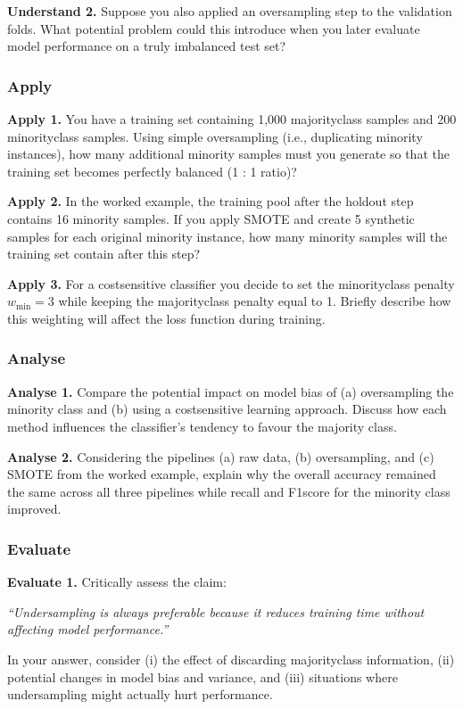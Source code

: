 \documentclass[12pt, a4paper]{article}
\begin{document}
\textbf{Understand 2.} Suppose you also applied an oversampling step to the validation folds.  What potential problem could this introduce when you later evaluate model performance on a truly imbalanced test set?  

\newpage
\subsubsection{Apply}
\textbf{Apply 1.} You have a training set containing 1,000 majorityclass samples and 200 minorityclass samples.  Using simple oversampling (i.e., duplicating minority instances), how many additional minority samples must you generate so that the training set becomes perfectly balanced (1 : 1 ratio)?  

\textbf{Apply 2.} In the worked example, the training pool after the holdout step contains 16 minority samples.  If you apply SMOTE and create 5 synthetic samples for each original minority instance, how many minority samples will the training set contain after this step?  

\textbf{Apply 3.} For a costsensitive classifier you decide to set the minorityclass penalty \(w_{\text{min}} = 3\) while keeping the majorityclass penalty equal to 1.  Briefly describe how this weighting will affect the loss function during training.  

\newpage
\subsubsection{Analyse}
\textbf{Analyse 1.} Compare the potential impact on model bias of (a) oversampling the minority class and (b) using a costsensitive learning approach.  Discuss how each method influences the classifier's tendency to favour the majority class.  

\textbf{Analyse 2.} Considering the pipelines (a) raw data, (b) oversampling, and (c) SMOTE from the worked example, explain why the overall accuracy remained the same across all three pipelines while recall and F1score for the minority class improved.  

\newpage
\subsubsection{Evaluate}
\textbf{Evaluate 1.} Critically assess the claim:  

\emph{``Undersampling is always preferable because it reduces training time without affecting model performance.''}  

In your answer, consider (i) the effect of discarding majorityclass information, (ii) potential changes in model bias and variance, and (iii) situations where undersampling might actually hurt performance.  

\newpage
\end{document}
